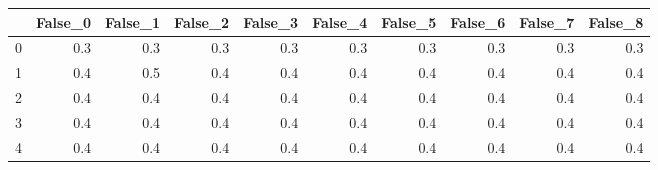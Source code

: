 \begin{tabular}{lrrrrrrrrr}
\toprule
{} &  False\_0 &  False\_1 &  False\_2 &  False\_3 &  False\_4 &  False\_5 &  False\_6 &  False\_7 &  False\_8 \\ \hline
\midrule
0 &      0.3 &      0.3 &      0.3 &      0.3 &      0.3 &      0.3 &      0.3 &      0.3 &      0.3 \\ \hline
1 &      0.4 &      0.5 &      0.4 &      0.4 &      0.4 &      0.4 &      0.4 &      0.4 &      0.4 \\ \hline
2 &      0.4 &      0.4 &      0.4 &      0.4 &      0.4 &      0.4 &      0.4 &      0.4 &      0.4 \\ \hline
3 &      0.4 &      0.4 &      0.4 &      0.4 &      0.4 &      0.4 &      0.4 &      0.4 &      0.4 \\ \hline
4 &      0.4 &      0.4 &      0.4 &      0.4 &      0.4 &      0.4 &      0.4 &      0.4 &      0.4 \\ \hline
\bottomrule
\end{tabular}
